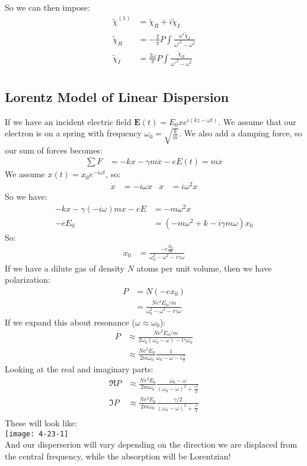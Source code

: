 So we can then impose:
\begin{align*}
	\tilde{\chi}^{(1)} &= \tilde{\chi}_R + i\tilde{\chi}_I \\
	\tilde{\chi}_R &= -\frac{2}{\pi} P\int \frac{\omega' \tilde{\chi}_I}{\omega'^2 - \omega^2} \\
	\tilde{\chi}_I &= \frac{2\omega}{\pi} P\int \frac{\tilde{\chi}_R}{\omega'^2 - \omega^2} \\
\end{align*}
\subsection{Lorentz Model of Linear Dispersion}
If we have an incident electric field $\bm{E}(t) = E_0 \hat{x} e^{i(kz-\omega t)}$. We assume that our electron is on a spring with frequency $\omega_0 = \sqrt{\frac{k}{m}}$. We also add a damping force, so our sum of forces becomes:
\begin{align*}
	\sum F &= -kx -\gamma m\dot{x}- e E(t) = m\ddot{x}
\end{align*}
We assume $x(t)= x_0 e^{-i\omega t}$, so:
\begin{align*}
	\dot{x} &= -i\omega x & \ddot{x} &= i\omega^2 x
\end{align*}
So we have:
\begin{align*}
	-kx -\gamma(-i\omega)mx - eE &= -m\omega^2 x \\
	-eE_0 &= \left(-m\omega^2 + k - i\gamma m\omega\right)x_0
\end{align*}
So:
\begin{align*}
	x_0 &= \frac{-e\frac{E_0}{m}}{\omega_0^2 - \omega^2 - i\gamma\omega}
\end{align*}
If we have a dilute gas of density $N$ atoms per unit volume, then we have polarization:
\begin{align*}
	P &= N(-ex_0) \\
	  &= \frac{Ne^2E_0/m}{\omega_0^2 - \omega^2 - i\gamma\omega}
\end{align*}
If we expand this about resonance ($\omega\approx\omega_0$):
\begin{align*}
	P &\approx \frac{Ne^2E_0/m}{2\omega_0(\omega_0-\omega) - i\gamma\omega_0} \\
	  &\approx \frac{Ne^2 E_0}{2m\omega_0} \frac{1}{\omega_0-\omega -i\frac{\gamma}{2}}
\end{align*}
Looking at the real and imaginary parts:
\begin{align*}
	\Re{P} &\approx \frac{Ne^2 E_0}{2m\omega_0} \frac{\omega_0-\omega }{(\omega_0-\omega)^2 +\frac{\gamma^2}{4}} \\
	\Im{P} &\approx \frac{Ne^2 E_0}{2m\omega_0} \frac{\gamma/2}{(\omega_0-\omega)^2 +\frac{\gamma^2}{4}} \\
\end{align*}
These will look like: \\
\texttt{[image: 4-23-1]} \\
And our disperserion will vary depending on the direction we are displaced from the central frequency, while the absorption will be Lorentzian!
